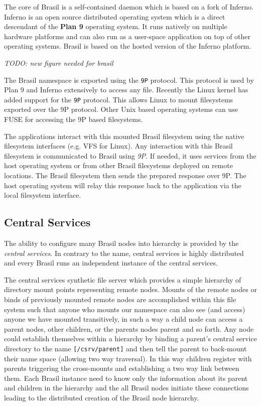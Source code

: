 The core of Brasil is a self-contained daemon which is based on a fork of
Inferno.
Inferno\cite{inferno} is an open source distributed operating system 
which is a direct descendant of the \textbf{Plan 9} operating system.  
It runs natively on
multiple hardware platforms and can also run as a user-space application on
top of other operating systems.
Brasil is based on the hosted version of the Inferno platform.

\emph{TODO: new figure needed for brasil}

The Brasil namespace is exported using the \texttt{9P} protocol. 
This protocol is used by Plan 9 and Inferno extensively to access any file. 
Recently the Linux kernel has added support for the \texttt{9P}
protocol\cite{graverobbers}.  This allows Linux to mount filesystems
exported over the 9P protocol.  Other Unix based operating systems can use
FUSE\cite{FUSE} for accessing the 9P based filesystems. 

The applications interact with this mounted Brasil filesystem using the native
filesystem interfaces (e.g. VFS for Linux). Any interaction with this Brasil
filesystem is communicated to Brasil using \textit{9P}. 
If needed, it uses services from the host operating system or from other Brasil
filesystems deployed on remote locations.  The Brasil filesystem then sends the
prepared response over 9P. The host operating system will relay this response
back to the application via the local filesystem interface.

\subsection{Central Services}

The ability to configure many Brasil nodes into hierarchy is provided by the
\textit{central services}.  In contrary to the name, central services is
highly distributed and every Brasil runs an independent instance of the central
services.  

The central services synthetic file server which provides a simple hierarchy of
directory mount points representing remote nodes.  Mounts of the remote nodes
or binds of previously mounted remote nodes are accomplished within this file
system such that anyone who mounts our namespace can also see (and
access) anyone we have mounted transitively,  in such a way a child
node can access a parent nodes, other children, or the parents nodes
parent and so forth. Any node could establish themselves within a
hierarchy by binding a parent's central service directory to the name
\texttt{[/csrv/parent]} and then tell the parent to back-mount their name space
(allowing two way traversal).  In this way children register with parents
triggering the cross-mounts and establishing a two way link between them. Each
Brasil instance need to know only the information about its parent and children
in the hierarchy and the all Brasil nodes initiate these connections leading to
the distributed creation of the Brasil node hierarchy.
 
